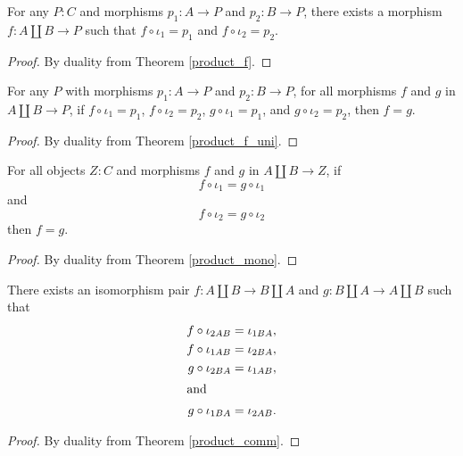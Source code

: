 \documentclass[../../math.tex]{subfiles}
\begin{document}
\begin{theorem} \label{coproduct_f} \label{coproduct_f1} \label{coproduct_f2}
    For any $P : C$ and morphisms $p_1 : A \to P$ and $p_2 : B \to P$, there
    exists a morphism $f : A \amalg B \to P$ such that $f \circ \iota_1 = p_1$
    and $f \circ \iota_2 = p_2$.
\end{theorem}
\begin{proof}
    By duality from Theorem \ref{product_f}.
\end{proof}

\begin{theorem} \label{coproduct_f_uni} \label{coproduct_f_uni2}
    For any $P$ with morphisms $p_1 : A \to P$ and $p_2 : B \to P$, for all
    morphisms $f$ and $g$ in $A \amalg B \to P$, if $f \circ \iota_1 = p_1$, $f
    \circ \iota_2 = p_2$, $g \circ \iota_1 = p_1$, and $g \circ \iota_2 = p_2$,
    then $f = g$.
\end{theorem}
\begin{proof}
    By duality from Theorem \ref{product_f_uni}.
\end{proof}

\begin{theorem} \label{coproduct_epi}
    For all objects $Z : C$ and morphisms $f$ and $g$ in $A \amalg B \to Z$,
    if
    \[
        f \circ \iota_1 = g \circ \iota_1
    \]
    and
    \[
        f \circ \iota_2 = g \circ \iota_2
    \]
    then $f = g$.
\end{theorem}
\begin{proof}
    By duality from Theorem \ref{product_mono}.
\end{proof}

\begin{theorem} \label{coproduct_comm}
    There exists an isomorphism pair $f : A \amalg B \to B \amalg A$ and $g : B
    \amalg A \to A \amalg B$ such that
    \begin{align*}
        f \circ \iota_{2AB} &= \iota_{1BA}, \\
        f \circ \iota_{1AB} &= \iota_{2BA}, \\
        g \circ \iota_{2BA} &= \iota_{1AB}, \\
    \intertext{and}
        g \circ \iota_{1BA} &= \iota_{2AB}.
    \end{align*}
\end{theorem}
\begin{proof}
    By duality from Theorem \ref{product_comm}.
\end{proof}
\end{document}
